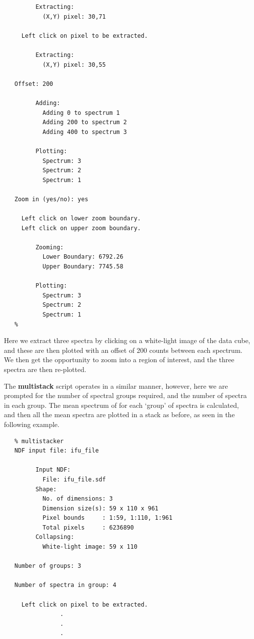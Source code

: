 \documentclass[twoside,11pt]{article}
\begin{document}
\begin{\htmlonly}
{\begin{verbatim}
         Extracting:
           (X,Y) pixel: 30,71
 
     Left click on pixel to be extracted.
 
         Extracting:
           (X,Y) pixel: 30,55
 
   Offset: 200
 
         Adding:
           Adding 0 to spectrum 1
           Adding 200 to spectrum 2
           Adding 400 to spectrum 3
 
         Plotting:
           Spectrum: 3 
           Spectrum: 2 
           Spectrum: 1 
 
   Zoom in (yes/no): yes
 
     Left click on lower zoom boundary.
     Left click on upper zoom boundary.
 
         Zooming:
           Lower Boundary: 6792.26
           Upper Boundary: 7745.58
 
         Plotting:
           Spectrum: 3
           Spectrum: 2
           Spectrum: 1
   %
\end{verbatim}\normalsize

Here we extract three spectra by clicking on a white-light image of
the data cube, and these are then plotted with an offset of 200 counts
between each spectrum.  We then get the opportunity to zoom into a
region of interest, and the three spectra are then re-plotted.

The {\bf multistack} script operates in a similar manner, however, here
we are prompted for the number of spectral groups required, and the
number of spectra in each group.  The mean spectrum of for each
`group' of spectra is calculated, and then all the mean spectra are
plotted in a stack as before, as seen in the following example. 

\small\begin{verbatim}
   % multistacker
   NDF input file: ifu_file
 
         Input NDF:
           File: ifu_file.sdf
         Shape:
           No. of dimensions: 3
           Dimension size(s): 59 x 110 x 961
           Pixel bounds     : 1:59, 1:110, 1:961
           Total pixels     : 6236890
         Collapsing:
           White-light image: 59 x 110
  
   Number of groups: 3
 
   Number of spectra in group: 4
  
     Left click on pixel to be extracted.
                .
                .
                .	     
\end{verbatim}\normalsize

}
\end{\htmlonly}
\end{document}
